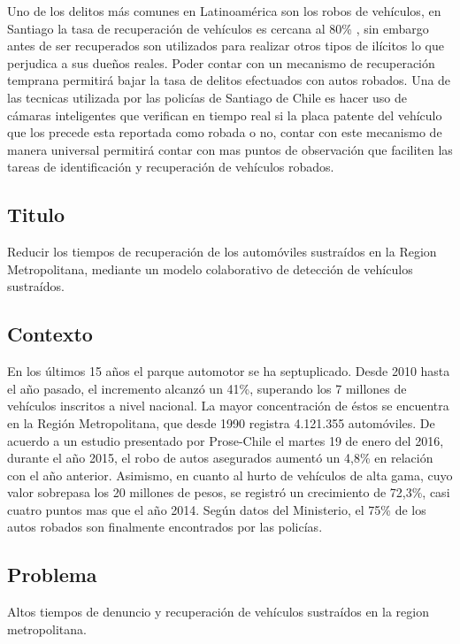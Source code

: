 \documentclass[12pt,letterpaper]{article}
\begin{document}
Uno de los delitos más comunes en Latinoamérica son los robos de vehículos\autocite{robos}, en Santiago la tasa de recuperación de vehículos es cercana al 80\% \autocite{recupero}, sin embargo antes de ser recuperados son utilizados para realizar otros tipos de ilícitos lo que perjudica a sus dueños reales. Poder contar con un mecanismo de recuperación temprana permitirá bajar la tasa de delitos efectuados con autos robados. Una de las tecnicas utilizada por las policías de Santiago de Chile es hacer uso de cámaras inteligentes\autocite{recono} que verifican en tiempo real si la placa patente del vehículo que los precede esta reportada como robada o no, contar con este mecanismo de manera universal permitirá contar con mas puntos de observación que faciliten las tareas de identificación y recuperación de vehículos robados.

\subsection{Titulo}
Reducir los tiempos de recuperación de los automóviles sustraídos en la Region Metropolitana, mediante un modelo colaborativo de detección de vehículos sustraídos.

\subsection{Contexto}
En los últimos 15 años el parque automotor se ha septuplicado. Desde 2010 hasta el año pasado, el incremento alcanzó un 41\%, superando los 7 millones de vehículos inscritos a nivel nacional\autocite{crecimiento}.
La mayor concentración de éstos se encuentra en la Región Metropolitana, que desde 1990 registra 4.121.355 automóviles.
De acuerdo a un estudio presentado por Prose-Chile\autocite{robos_2015} el martes 19 de enero del 2016, durante el año 2015, el robo de autos asegurados aumentó un 4,8\% en relación con el año anterior. Asimismo, en cuanto al hurto de vehículos de alta gama, cuyo valor sobrepasa los 20 millones de pesos, se registró un crecimiento de 72,3\%, casi cuatro puntos mas que el año 2014.
Según datos del Ministerio, el 75\% de los autos robados son finalmente encontrados por las policías.

\subsection{Problema}
Altos tiempos de denuncio y recuperación de vehículos sustraídos en la region metropolitana.
\end{document}
